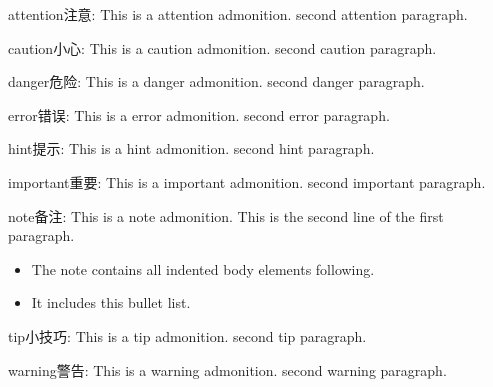 \documentclass[a4paper,10pt,english]{sphinxmanual}
\begin{document}
\sphinxAtStartPar
{}

\begin{sphinxadmonition}{attention}{注意:}
\sphinxAtStartPar
This is a attention admonition.
second attention paragraph.
\end{sphinxadmonition}

\begin{sphinxadmonition}{caution}{小心:}
\sphinxAtStartPar
This is a caution admonition.
second caution paragraph.
\end{sphinxadmonition}

\begin{sphinxadmonition}{danger}{危险:}
\sphinxAtStartPar
This is a danger admonition.
second danger paragraph.
\end{sphinxadmonition}

\begin{sphinxadmonition}{error}{错误:}
\sphinxAtStartPar
This is a error admonition.
second error paragraph.
\end{sphinxadmonition}

\begin{sphinxadmonition}{hint}{提示:}
\sphinxAtStartPar
This is a hint admonition.
second hint paragraph.
\end{sphinxadmonition}

\begin{sphinxadmonition}{important}{重要:}
\sphinxAtStartPar
This is a important admonition.
second important paragraph.
\end{sphinxadmonition}

\begin{sphinxadmonition}{note}{备注:}
\sphinxAtStartPar
This is a note admonition.
This is the second line of the first paragraph.
\begin{itemize}
\item {} 
\sphinxAtStartPar
The note contains all indented body elements
following.

\item {} 
\sphinxAtStartPar
It includes this bullet list.

\end{itemize}
\end{sphinxadmonition}

\begin{sphinxadmonition}{tip}{小技巧:}
\sphinxAtStartPar
This is a tip admonition.
second tip paragraph.
\end{sphinxadmonition}

\begin{sphinxadmonition}{warning}{警告:}
\sphinxAtStartPar
This is a warning admonition.
second warning paragraph.
\end{sphinxadmonition}
\end{document}
